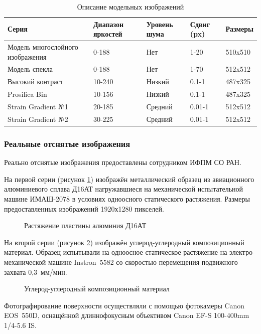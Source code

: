 \begin{longtable}[h!]{|m{}|m{}|m{}|m{}|m{}|}
\caption{Описание модельных изображений}
\label{tab:set_image}
\\ \hline
Серия & Диапазон яркостей 	& Уровень шума & Сдвиг (px) &  Размеры \\ \hline
Модель многослойного изображения & 0-188 & Нет & 1-20 &  510x510 \\ \hline
Модель спекла & 0-188 & Нет & 1-70 &  512x512 \\ \hline
Высокий контраст & 10-240 & Низкий  & 0.1-1 & 487x325 \\ \hline
Prosilica Bin  & 10-156 & Низкий  & 0.1-1 & 487x325 \\ \hline
Strain Gradient №1 & 20-185 	& Средний  & 0.01-1 & 512x512 \\ \hline
Strain Gradient №2 & 30-225 	& Средний  & 0.01-1 & 512x512 \\ \hline
\end{longtable}

\subsubsection{Реальные отснятые изображения}

Реально отснятые изображения предоставлены сотрудником ИФПМ СО РАН. 

На первой серии (рисунок \ref{pic:al_deform}) изображён металлический образец из авиационного алюминиевого сплава Д16АТ нагружавшиеся на механической испытательной машине ИМАШ-2078 в условиях одноосного статического растяжения. Размеры предоставленных изображений 1920х1280 пикселей.
\begin{figure}[ht]
\caption{Растяжение пластины алюминия Д16АТ}
\label{pic:al_deform}
\end{figure}

На второй серии (рисунок \ref{pic:carbon_deform}) изображён углерод-углеродный композиционный материал. Образец испытывали на одноосное статическое растяжение на электро-механической машине Instron 5582 со скоростью перемещения подвижного захвата 0,3 мм/мин.
\begin{figure}[h!]
\caption{Углерод-углеродный композиционный материал}
\label{pic:carbon_deform}
\end{figure}

Фотографирование поверхности осуществляли с помощью фотокамеры Canon EOS 550D, оснащённой длиннофокусным объективом Canon EF-S 100-400mm 1/4-5.6 IS.

